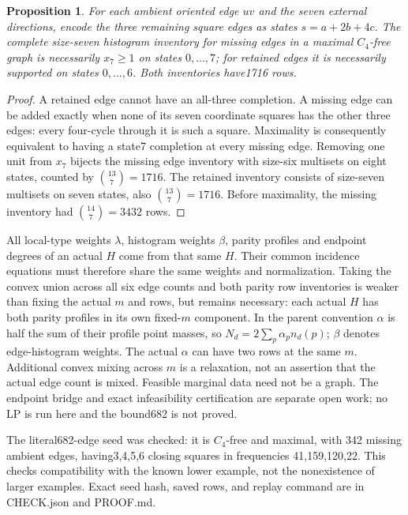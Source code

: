 \documentclass{article}
\newtheorem{proposition}{Proposition}
\begin{document}
\begin{proposition}
For each ambient oriented edge $uv$ and the seven external directions,
encode the three remaining square edges as states $s=a+2b+4c$. The
complete size-seven histogram inventory for missing edges in a maximal
$C_4$-free graph is necessarily $x_7\ge1$ on states $0,\ldots,7$;
for retained edges it is necessarily supported on states $0,\ldots,6$.
Both inventories have1716 rows.
\end{proposition}
\begin{proof}
A retained edge cannot have an all-three completion. A missing edge can
be added exactly when none of its seven coordinate squares has the
other three edges: every four-cycle through it is such a square.
Maximality is consequently equivalent to having a state7 completion
at every missing edge. Removing one unit from $x_7$ bijects the missing
edge inventory with size-six multisets on eight states, counted by
$\binom{13}{7}=1716$. The retained inventory consists of size-seven
multisets on seven states, also $\binom{13}{7}=1716$. Before maximality,
the missing inventory had $\binom{14}{7}=3432$ rows.
\end{proof}

All local-type weights $\lambda$, histogram weights $\beta$, parity
profiles and endpoint degrees of an actual $H$ come from that same $H$.
Their common incidence equations must therefore share the same weights
and normalization. Taking the convex union across all six edge counts
and both parity row inventories is weaker than fixing the actual $m$
and rows, but remains necessary: each actual $H$ has both parity profiles in its own fixed-$m$
component. In the parent convention $\alpha$ is half the sum of their
profile point masses, so $N_d=2\sum_p\alpha_p n_d(p)$; $\beta$
denotes edge-histogram weights. The actual $\alpha$ can have two rows
at the same $m$. Additional convex mixing across $m$ is a relaxation,
not an assertion that the actual edge count is mixed. Feasible marginal data need not be a graph. The endpoint
bridge and exact infeasibility certification are separate open work;
no LP is run here and the bound682 is not proved.

The literal682-edge seed was checked: it is $C_4$-free and maximal, with
342 missing ambient edges, having3,4,5,6 closing squares in frequencies
41,159,120,22. This checks compatibility with the known lower example,
not the nonexistence of larger examples. Exact seed hash, saved rows,
and replay command are in CHECK.json and PROOF.md.
\end{document}
